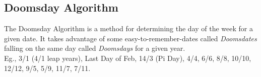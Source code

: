 \subsection{Doomsday Algorithm}
The Doomsday Algorithm is a method for determining the day of the week for a given date. It  takes advantage of some easy-to-remember-dates called \emph{Doomsdates} falling on the same day called \emph{Doomsdays} for a given year.\\
Eg., 3/1 (4/1 leap years), Last Day of Feb, 14/3 (Pi Day), 4/4, 6/6, 8/8, 10/10, 12/12, 9/5, 5/9, 11/7, 7/11.


